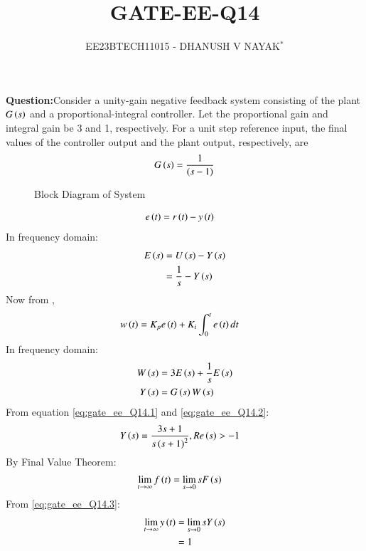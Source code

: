 \documentclass[journal,12pt,twocolumn]{IEEEtran}
\theoremstyle{remark}
\begin{document}

\title{GATE-EE-Q14}
\author{EE23BTECH11015 - DHANUSH V NAYAK$^{*}$%
}
\maketitle
\newpage
\bigskip
\renewcommand{\thefigure}{\arabic{figure}}
\renewcommand{\thetable}{\theenumi}
\textbf{Question:}Consider a unity-gain negative feedback system consisting of the plant $G\left(s\right)$  and a proportional-integral controller. Let the proportional gain and integral
gain be 3 and 1, respectively. For a unit step reference input, the final values of the
controller output and the plant output, respectively, are
\begin{align}
    G\left(s\right) = \frac{1}{\left(s-1\right)} \notag
\end{align}
\solution 

\begin{figure}[H]
    \centering
    \resizebox{0.52\textwidth}{!}{}
    \caption{Block Diagram of System}
    \label{fig:gate_ee_Q14_blockdiagram}
\end{figure}
\begin{align}
    e\left(t\right) &= r\left(t\right) - y\left(t\right)  
\end{align}
In frequency domain:
\begin{align}
    E\left(s\right)&= U\left(s\right) - Y\left(s\right)\\
             &= \frac{1}{s} - Y\left(s\right)\label{eq:gate_ee_Q14.1}
\end{align} 
Now from ,
\begin{align}
    w\left(t\right) &= K_{p}e\left(t\right) + K_{i}\int_{0}^{t}e\left(t\right) dt
\end{align}
In frequency domain:
\begin{align}
    W\left(s\right) &= 3E\left(s\right) + \frac{1}{s}E\left(s\right)\label{eq:gate_ee_Q14.2}\\
    Y\left(s\right) &= G\left(s\right)W\left(s\right)
\end{align}
From equation \eqref{eq:gate_ee_Q14.1} and \eqref{eq:gate_ee_Q14.2}:
\begin{align}
    Y\left(s\right) &=  \frac{3s+1}{s\left(s+1\right)^2} ,  Re\left(s\right)>-1
\end{align}
By Final Value Theorem:
\begin{align}
    \lim_{t \to \infty} f\left(t\right)&= \lim_{s \to 0} sF\left(s\right)\label{eq:gate_ee_Q14.3}
\end{align}
From \eqref{eq:gate_ee_Q14.3}:
\begin{align}
     \lim_{t \to \infty} y\left(t\right)&= \lim_{s \to 0} sY\left(s\right)\\
                            &= 1
\end{align}
\end{document}
